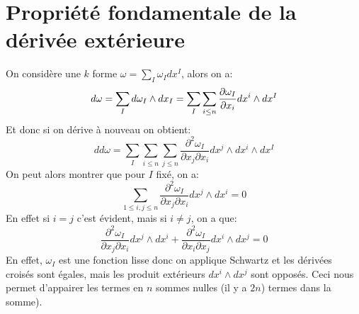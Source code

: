    \section{Propriété fondamentale de la dérivée extérieure}
   On considère une \( k \) forme \( \omega = \sum_I \omega_I dx^I\), alors on a:
   \[ 
      d\omega = \sum_I d\omega_I \wedge dx_I = \sum_I \sum_{i \leq n} \frac{\partial \omega_I}{\partial x_i}dx^i \wedge dx^I
   \]
   Et donc si on dérive à nouveau on obtient:
   \[ 
      dd\omega =  \sum_I \sum_{i \leq n} \sum_{j \leq n} \frac{\partial^2 \omega_I}{\partial x_j \partial x_i} dx^j \wedge dx^i \wedge dx^I
   \]
   On peut alors montrer que pour \( I \) fixé, on a:
   \[ 
      \sum_{1 \leq i, j\leq n} \frac{\partial^2 \omega_I}{\partial x_j \partial x_i} dx^j \wedge dx^i = 0
   \]
   En effet si \( i = j \) c'est évident, mais si \( i \neq j \), on a que:
   \[ 
      \frac{\partial^2 \omega_I}{\partial x_j \partial x_i} dx^j \wedge dx^i + \frac{\partial^2 \omega_I}{\partial x_i \partial x_j} dx^i \wedge dx^j = 0
   \]
   En effet, \( \omega_I \) est une fonction lisse donc on applique Schwartz et les dérivées croisés sont égales, mais les produit extérieurs \( dx^i \wedge dx^j \) sont opposés. Ceci nous permet d'appairer les termes en \( n \) sommes nulles (il y a \( 2n \)) termes dans la somme).
 